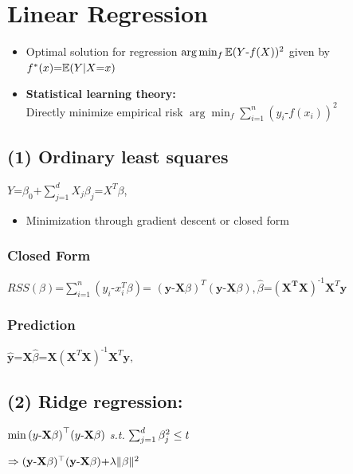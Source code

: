\section{Linear Regression}
\begin{itemize}
	\item Optimal solution for regression $\arg\min_f\mathbb E(Y \text{-} f(X))^2$ given by $f^*(x) \text{=} \mathbb E(Y | X\text{=}x)$ \
	\item \textbf{Statistical learning theory: } \\ Directly minimize empirical risk $\arg\min_f\sum_{i \text{=} 1}^n (y_i \text{-} f(x_i))^2$
\end{itemize}
\subsection*{(1) Ordinary least squares}
$
	Y \text{=} \beta_0 \text{+} \sum_{j \text{=} 1}^d X_j\beta_j \text{=} X^T\beta$, 


\begin{itemize}
	\item Minimization through gradient descent or closed form 
\end{itemize}
\subsubsection{Closed Form}
$
	RSS(\beta) \text{=} \sum_{i \text{=} 1}^n (y_i \text{-} x_i^T\beta) \text{=}
$ 
$
	(\mathbf y \text{-} \mathbf X\beta)^T(\mathbf y \text{-} \mathbf X\beta), 
\hat\beta \text{=} (\mathbf{X^TX})^{\text{-}1}\mathbf X^T\mathbf y$


\subsubsection{Prediction}
$
	\hat{\mathbf y} \text{=} \mathbf X \hat\beta \text{=} \mathbf X(\mathbf X^T\mathbf X)^{\text{-}1}\mathbf X^T \mathbf y, 
$





\subsection*{(2) Ridge regression: }
$	\min {(y\text{-} \mathbf X\beta)}^\top(y\text{-}\mathbf X\beta)$  \textit{ s.t. } $\sum_{j = 1}^{d} \beta_j^2 \leq t 
$


$ \Rightarrow (\mathbf y \text{-} \mathbf X\beta)^\top(\mathbf y \text{-} \mathbf X\beta) \text{+} \lambda\|\beta\|^2$

